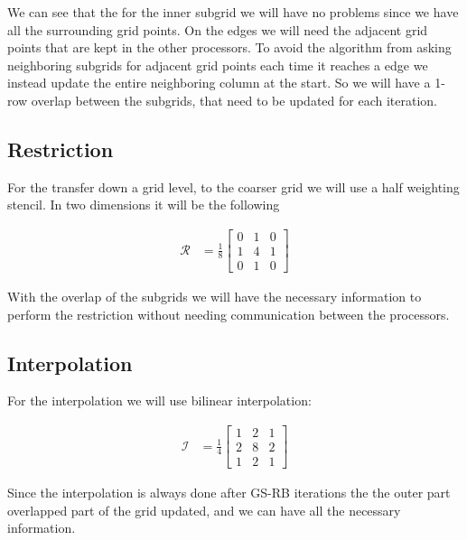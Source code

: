 			We can see that the for the inner subgrid we will have no problems since we have all the surrounding grid points. On the edges we will need the adjacent grid points that are kept in the other processors. To avoid the algorithm from asking neighboring subgrids for adjacent grid points each time it reaches a edge we instead update the entire neighboring column at the start. So we will have a 1-row overlap between the subgrids, that need to be updated for each iteration.


		\subsection{Restriction}
			For the transfer down a grid level, to the coarser grid we will use a half weighting stencil. In two dimensions it will be the following

			\begin{align}
				\mathcal{R} &= \frac{1}{8}
				\begin{bmatrix}
					0 & 1 & 0
					\\
					1 & 4 & 1
					\\
					0 & 1 & 0
				\end{bmatrix}
			\end{align}

			With the overlap of the subgrids we will have the necessary information to perform the restriction without needing communication between the processors. \citep{Trottenberg}

		\subsection{Interpolation}
			For the interpolation we will use bilinear interpolation:

			\begin{align}
				\mathcal{I} &= \frac{1}{4}
				\begin{bmatrix}
					1 & 2 & 1
					\\
					2 & 8 & 2
					\\
					1 & 2 & 1
				\end{bmatrix}
			\end{align}

			Since the interpolation is always done after GS-RB iterations the the outer part overlapped part of the grid updated, and we can have all the necessary information.
